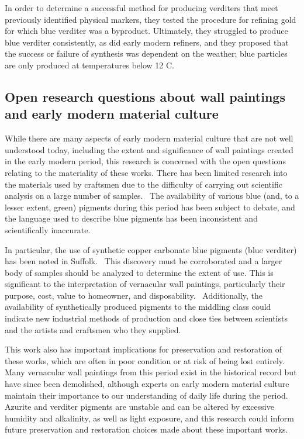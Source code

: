 In order to determine a successful method for producing verditers that meet previously identified physical markers, they tested the procedure for refining gold for which blue verditer was a byproduct. Ultimately, they struggled to produce blue verditer consistently, as did early modern refiners, and they proposed that the success or failure of synthesis was dependent on the weather; blue particles are only produced at temperatures below 12 \textdegree C.~\autocite{MacTaggart}

\subsection[Open research questions about wall paintings]{Open research questions about wall paintings and early modern material culture}
\label{subsection1.1.4}

While there are many aspects of early modern material culture that are not well understood today, including the extent and significance of wall paintings created in the early modern period, this research is concerned with the open questions relating to the materiality of these works. There has been limited research into the materials used by craftsmen due to the difficulty of carrying out scientific analysis on a large number of samples.~\autocite{Baird_thesis, Davies_book} The availability of various blue (and, to a lesser extent, green) pigments during this period has been subject to debate, and the language used to describe blue pigments has been inconsistent and scientifically inaccurate.~\autocite{Harley} 

In particular, the use of synthetic copper carbonate blue pigments (blue verditer) has been noted in Suffolk.~\autocite{Baird_thesis, Kirkham_thesis} This discovery must be corroborated and a larger body of samples should be analyzed to determine the extent of use. This is significant to the interpretation of vernacular wall paintings, particularly their purpose, cost, value to homeowner, and disposability.~\autocite{Baird_thesis,Davies_book} Additionally, the availability of synthetically produced pigments to the middling class could indicate new industrial methods of production and close ties between scientists and the artists and craftsmen who they supplied. 

This work also has important implications for preservation and restoration of these works, which are often in poor condition or at risk of being lost entirely. Many vernacular wall paintings from this period exist in the historical record but have since been demolished, although experts on early modern material culture maintain their importance to our understanding of daily life during the period.~\autocite{Davies_book,Hamling_book,Benton1,Benton2} Azurite and verditer pigments are unstable and can be altered by excessive humidity and alkalinity, as well as light exposure, and this research could inform future preservation and restoration choices made about these important works.~\autocite{Saunders,Cardell,Lluveras,Mattei,Dei}



